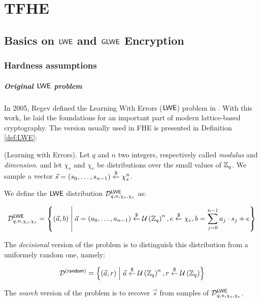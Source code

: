 
\chapter{TFHE}



\section{Basics on $\textsf{LWE}$ and $\textsf{GLWE}$ Encryption}


\subsection{Hardness assumptions}


\paragraph{Original $\textsf{LWE}$ problem}

In 2005, Regev defined the Learning With Errors ($\textsf{LWE}$) problem in \cite{regev_lwe}. With this work, he laid the foundations for an important part of modern lattice-based cryptography. The version usually used in FHE is presented in Definition \ref{def:LWE}:


\begin{definition}
	(Learning with Errors). Let $q$ and $n$ two integers, respectively called \textit{modulus} and \textit{dimension}.  and let $\chi_s$ and $\chi_e$ be distributions over the small values of $\mathbb{Z}_q$. We sample a vector $\vec s = (s_0, \dots, s_{n-1}) \overset{\$}{\leftarrow} \chi_s^n$. 
	
	We define the $\textsf{LWE}$ distribution $\mathcal{D}_{q, n, \chi_s, \chi_e}^{\textsf{LWE}}$ as:
	
	 \[
	 \mathcal{D}_{q, n, \chi_s, \chi_e}^{\textsf{LWE}} = \left \{(\vec a, b) \;\middle|\; \vec a = (a_0, \dots, a_{n-1}) \overset{\$}{\leftarrow} \mathcal U \left ( \mathbb{Z}_q \right )^n, e \overset{\$}{\leftarrow} \chi_e, b = \sum_{j=0}^{n-1} a_j \cdot s_j + e \right \}
	  \]
	 
	 The \textit{decisional} version of the problem is to distinguish this distribution from a uniformely random one, namely:
	
	\[
	\mathcal{D}^{(\textsf{random})} = \left \{(\vec a, r) \;\middle|\; \vec a \overset{\$}{\leftarrow} \mathcal U \left ( \mathbb{Z}_q \right )^n, r \overset{\$}{\leftarrow} \mathcal U \left ( \mathbb{Z}_q \right ) \right\}
	\]

	The \emph{search} version of the problem is to recover $\vec s$ from samples of $\mathcal{D}_{q, n, \chi_s, \chi_e}^{\textsf{LWE}}$. 
	\label{def:LWE}
\end{definition}


